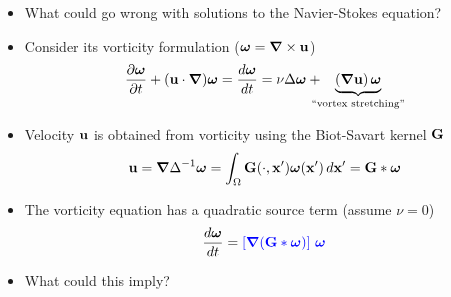 \documentclass{beamer}
\def\Dpartial#1#2{ {\partial #1 \over \partial #2} }
\def\Bmp#1{ \begin{minipage}{#1} }
\def\Emp{ \end{minipage} }
\def\blue#1{{\color{blue}{ #1 }}}
\def\bG{{\bf G}}
\def\x{{\bf x}}
\def\u{{\bf u}}
\def\bnabla{\boldsymbol{\nabla}}
\def\bomega{\boldsymbol{\omega}}
\begin{document}

\frame
{
\hspace*{-1.0cm}
\Bmp{12cm}
\raggedright

\begin{itemize}
\item<1->
What could go wrong with solutions to the Navier-Stokes equation?
\medskip

\item<2->
Consider its vorticity formulation ($\bomega = \bnabla \times \u$)
\small
\begin{equation*}
\Dpartial{\bomega}{t}+({\u}\cdot{\bnabla}){\bomega} = \frac{d \bomega}{dt} 
= \nu\Delta{{\bomega}} + \hspace*{-0.3cm} \underbrace{(\bnabla\u)\,\bomega}_{\text{``vortex stretching''}} 
\end{equation*}
\smallskip

\normalsize
\item<3->
Velocity $\u$ is obtained from vorticity using the Biot-Savart kernel $\bG$
\small
\begin{equation*}
\u = \bnabla \Delta^{-1} \bomega = \int_{\Omega} \bG(\cdot,\x')\bomega(\x')\, d\x' = \bG * \bomega
\end{equation*}

\normalsize
\item<4->
The vorticity equation has a quadratic source term (assume $\nu = 0$)
\small
\begin{equation*}
\frac{d \bomega}{dt} 
= \blue{\left[ \bnabla (\bG * \bomega) \right] \,\bomega}
\end{equation*}

\normalsize
\item<5->
What could this imply?


\end{itemize}
\Emp
}


\end{document}
